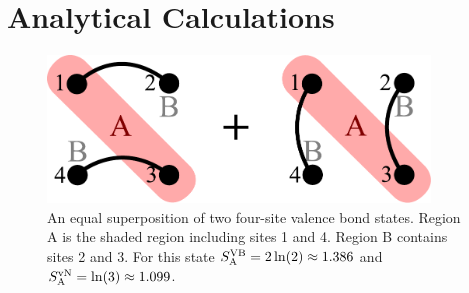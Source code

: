 \section{Analytical Calculations}



\begin{figure}
\centering
\includegraphics[width=4in]{./figures/made/example1.pdf}
\caption[A superposition of two four-site valence bond states]{An equal superposition of two four-site valence bond states.  
Region A is the shaded region including sites 1 and 4.
Region B contains sites 2 and 3.
For this state $S^{\text{VB}}_{\rm A}=2\ln(2)\approx1.386$ and $S^{\text{vN}}_{\rm A}=\ln(3)\approx 1.099$.
 \label{example1}
}
\end{figure}

